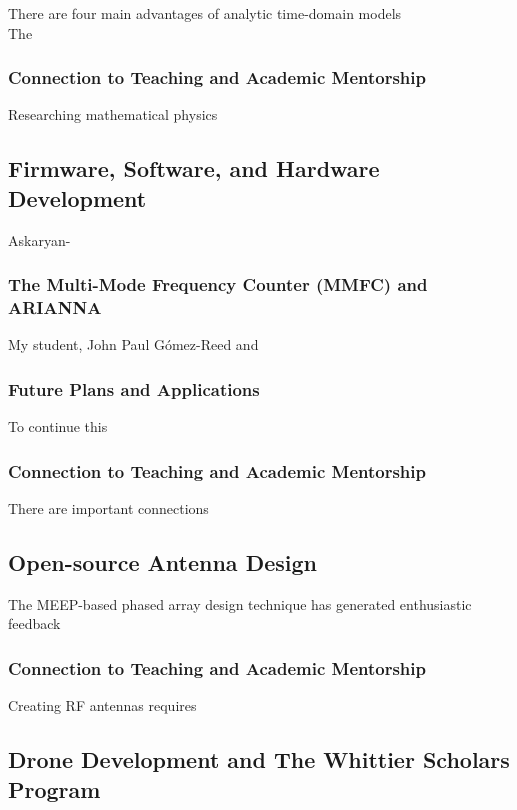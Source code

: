 \documentclass[../../../main.tex]{subfiles}
\begin{document}
There are four main advantages of analytic time-domain models
\\
\vspace{0.15cm}
The

\subsubsection{Connection to Teaching and Academic Mentorship}

Researching mathematical physics

\subsection{Firmware, Software, and Hardware Development}

Askaryan-

\subsubsection{The Multi-Mode Frequency Counter (MMFC) and ARIANNA}

My student, John Paul G\'{o}mez-Reed and 

\subsubsection{Future Plans and Applications}

To continue this 

\subsubsection{Connection to Teaching and Academic Mentorship}

There are important connections 

\subsection{Open-source Antenna Design}

The MEEP-based phased array design technique has generated enthusiastic feedback

\subsubsection{Connection to Teaching and Academic Mentorship}

Creating RF antennas requires 

\subsection{Drone Development and The Whittier Scholars Program}
\end{document}
